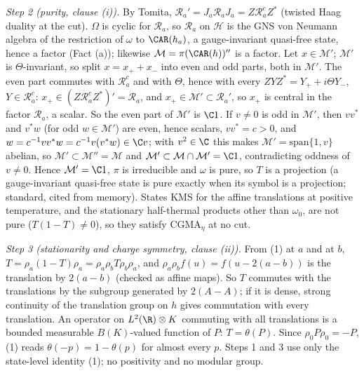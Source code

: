 \emph{Step 2 (purity, clause (i)).} By Tomita, $\mathcal{R}_{a}' = J_{a}\mathcal{R}_{a}J_{a} = Z\mathcal{R}_{a}^{c}Z^{*}$ (twisted Haag duality at the cut). $\Omega$ is cyclic for $\mathcal{R}_{a}$, so $\mathcal{R}_{a}$ on $\mathcal{H}$ is the GNS von Neumann algebra of the restriction of $\omega$ to $\CAR(h_{a})$, a gauge-invariant quasi-free state, hence a factor (Fact (a)); likewise $\mathcal{M} = \pi(\CAR(h))''$ is a factor. Let $x \in \mathcal{M}'$; $\mathcal{M}'$ is $\Theta$-invariant, so split $x = x_{+} + x_{-}$ into even and odd parts, both in $\mathcal{M}'$. The even part commutes with $\mathcal{R}_{a}^{c}$ and with $\Theta$, hence with every $ZYZ^{*} = Y_{+} + i\Theta Y_{-}$, $Y \in \mathcal{R}_{a}^{c}$: $x_{+} \in (Z\mathcal{R}_{a}^{c}Z^{*})' = \mathcal{R}_{a}$, and $x_{+} \in \mathcal{M}' \subset \mathcal{R}_{a}'$, so $x_{+}$ is central in the factor $\mathcal{R}_{a}$, a scalar. So the even part of $\mathcal{M}'$ is $\C 1$. If $v \ne 0$ is odd in $\mathcal{M}'$, then $vv^{*}$ and $v^{*}w$ (for odd $w \in \mathcal{M}'$) are even, hence scalars, $vv^{*} = c > 0$, and $w = c^{-1}vv^{*}w = c^{-1}v(v^{*}w) \in \C v$; with $v^{2} \in \C$ this makes $\mathcal{M}' = \mathrm{span}\{1, v\}$ abelian, so $\mathcal{M}' \subset \mathcal{M}'' = \mathcal{M}$ and $\mathcal{M}' \subset \mathcal{M}\cap\mathcal{M}' = \C 1$, contradicting oddness of $v \ne 0$. Hence $\mathcal{M}' = \C 1$, $\pi$ is irreducible and $\omega$ is pure, so $T$ is a projection (a gauge-invariant quasi-free state is pure exactly when its symbol is a projection; standard, cited from memory). States KMS for the affine translations at positive temperature, and the stationary half-thermal products other than $\omega_{0}$, are not pure ($T(1 - T) \ne 0$), so they satisfy CGMA$_{\eta}$ at no cut.

\emph{Step 3 (stationarity and charge symmetry, clause (ii)).} From (1) at $a$ and at $b$, $T = \rho_{a}(1 - T)\rho_{a} = \rho_{a}\rho_{b}T\rho_{b}\rho_{a}$, and $\rho_{a}\rho_{b}f(u) = f(u - 2(a - b))$ is the translation by $2(a - b)$ (checked as affine maps). So $T$ commutes with the translations by the subgroup generated by $2(A - A)$; if it is dense, strong continuity of the translation group on $h$ gives commutation with every translation. An operator on $L^{2}(\R)\otimes K$ commuting with all translations is a bounded measurable $B(K)$-valued function of $P$: $T = \theta(P)$. Since $\rho_{0}P\rho_{0} = -P$, (1) reads $\theta(-p) = 1 - \theta(p)$ for almost every $p$. Steps 1 and 3 use only the state-level identity (1); no positivity and no modular group.

